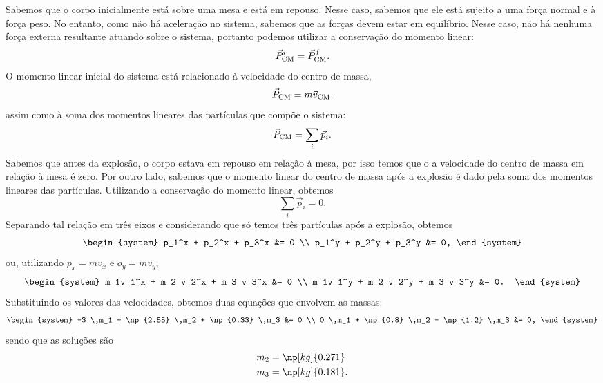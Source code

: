 Sabemos que o corpo inicialmente está sobre uma mesa e está em repouso. Nesse caso, sabemos que ele está sujeito a uma força normal e à força peso. No entanto, como não há aceleração no sistema, sabemos que as forças devem estar em equilíbrio. Nesse caso, não há nenhuma força externa resultante atuando sobre o sistema, portanto podemos utilizar a conservação do momento linear:
\begin{equation}
    \vec{P}_{\rm{CM}}^i = \vec{P}_{\rm{CM}}^f.
\end{equation}
%
O momento linear inicial do sistema está relacionado à velocidade do centro de massa,
\begin{equation}
    \vec{P}_{\rm{CM}} = m \vec{v}_{\rm{CM}},
\end{equation}
%
assim como à soma dos momentos lineares das partículas que compõe o sistema:
\begin{equation}
    \vec{P}_{\rm{CM}} = \sum_i \vec{p}_i.
\end{equation}
%
Sabemos que antes da explosão, o corpo estava em repouso em relação à mesa, por isso temos que o a velocidade do centro de massa em relação à mesa é zero. Por outro lado, sabemos que o momento linear do centro de massa após a explosão é dado pela soma dos momentos lineares das partículas. Utilizando a conservação do momento linear, obtemos
\begin{equation}
    \sum_i \vec{p}_i = 0.
\end{equation}
%
Separando tal relação em três eixos e considerando que só temos três partículas após a explosão, obtemos
\begin{equation}
\begin{system}
    p_1^x + p_2^x + p_3^x &= 0 \\
    p_1^y + p_2^y + p_3^y &= 0,
\end{system}
\end{equation}
%
ou, utilizando $p_x = m v_x$ e $o_y = mv_y$,
\begin{equation}
\begin{system}
    m_1v_1^x + m_2 v_2^x + m_3 v_3^x &= 0 \\
    m_1v_1^y + m_2 v_2^y + m_3 v_3^y &= 0.
\end{system}
\end{equation}
%
Substituindo os valores das velocidades, obtemos duas equações que envolvem as massas:
\begin{equation}
\begin{system}
    -3 \,m_1 + \np{2.55} \,m_2 + \np{0.33} \,m_3 &= 0 \\
    0 \,m_1 + \np{0.8} \,m_2 - \np{1.2} \,m_3 &= 0,
\end{system}
\end{equation}
%
sendo que as soluções são
\begin{align}
    m_2 &= \np[kg]{0.271} \\
    m_3 &= \np[kg]{0.181}.
\end{align}

